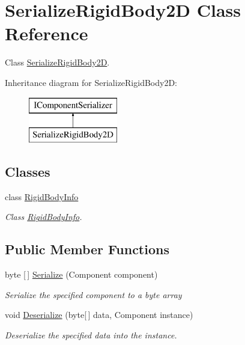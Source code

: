 \hypertarget{class_serialize_rigid_body2_d}{}\section{Serialize\+Rigid\+Body2D Class Reference}
\label{class_serialize_rigid_body2_d}


Class \hyperlink{class_serialize_rigid_body2_d}{Serialize\+Rigid\+Body2D}.  


Inheritance diagram for Serialize\+Rigid\+Body2D\+:\begin{figure}[H]
\begin{center}
\leavevmode
\includegraphics[height=2.000000cm]{class_serialize_rigid_body2_d}
\end{center}
\end{figure}
\subsection*{Classes}
\begin{DoxyCompactItemize}
\item 
class \hyperlink{class_serialize_rigid_body2_d_1_1_rigid_body_info}{Rigid\+Body\+Info}
\begin{DoxyCompactList}\small\item\em Class \hyperlink{class_serialize_rigid_body2_d_1_1_rigid_body_info}{Rigid\+Body\+Info}. \end{DoxyCompactList}\end{DoxyCompactItemize}
\subsection*{Public Member Functions}
\begin{DoxyCompactItemize}
\item 
byte \mbox{[}$\,$\mbox{]} \hyperlink{class_serialize_rigid_body2_d_a40d4ecd6dc6a136cb123fbb76d6ead00}{Serialize} (Component component)
\begin{DoxyCompactList}\small\item\em Serialize the specified component to a byte array \end{DoxyCompactList}\item 
void \hyperlink{class_serialize_rigid_body2_d_ae143c153be5caaaa898e0d7e2951fbd2}{Deserialize} (byte\mbox{[}$\,$\mbox{]} data, Component instance)
\begin{DoxyCompactList}\small\item\em Deserialize the specified data into the instance. \end{DoxyCompactList}\end{DoxyCompactItemize}


